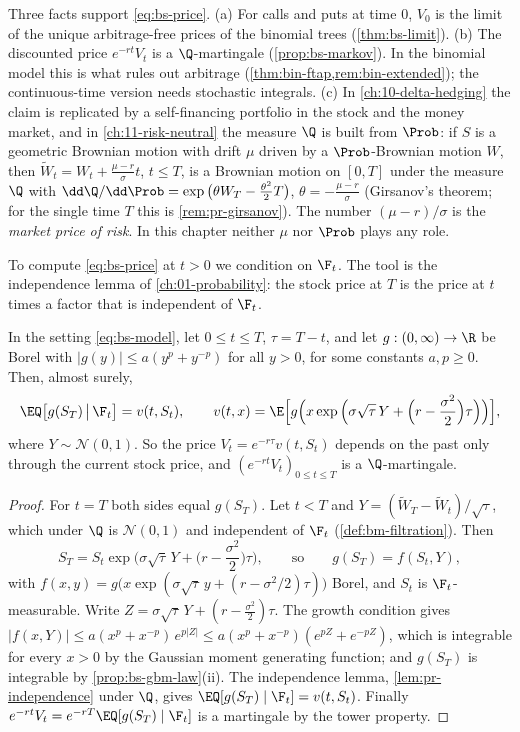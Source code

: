 \begin{remark}\label{rem:bs-justification}
Three facts support \eqref{eq:bs-price}.
(a) For calls and puts at time $0$, $V_0$ is the limit of the unique arbitrage-free prices of
the binomial trees (\cref{thm:bs-limit}). (b) The discounted price $e^{-rt}V_t$ is a
$\Q$-martingale (\cref{prop:bs-markov}). In the binomial model this is what rules out
arbitrage (\cref{thm:bin-ftap,rem:bin-extended}); the continuous-time version needs
stochastic integrals. (c) In \cref{ch:10-delta-hedging} the claim is
replicated by a self-financing portfolio in the stock and the money market, and in
\cref{ch:11-risk-neutral} the measure $\Q$ is built from $\Prob$: if $S$ is a geometric
Brownian motion with drift $\mu$ driven by a $\Prob$-Brownian motion $W$, then
$\widetilde W_t=W_t+\frac{\mu-r}{\sigma}t$, $t\le T$, is a Brownian motion on $[0,T]$ under the measure $\Q$ with
$\dd\Q/\dd\Prob=\exp\big(\theta W_T-\frac{\theta^2}2T\big)$, $\theta=-\frac{\mu-r}{\sigma}$
(Girsanov's theorem; for the single time $T$ this is \cref{rem:pr-girsanov}). The number
$(\mu-r)/\sigma$ is the \emph{market price of risk}. In this chapter neither $\mu$ nor
$\Prob$ plays any role.
\end{remark}

To compute \eqref{eq:bs-price} at $t>0$ we condition on $\F_t$. The tool is the independence
lemma of \cref{ch:01-probability}: the stock price at $T$ is the price at $t$ times a factor
that is independent of $\F_t$.

\begin{proposition}\label{prop:bs-markov}
In the setting \eqref{eq:bs-model}, let $0\le t\le T$, $\tau=T-t$, and let
$g:(0,\infty)\to\R$ be Borel with $|g(y)|\le a(y^p+y^{-p})$ for all $y>0$, for some constants
$a,p\ge0$. Then, almost surely,
\[
  \EQ\big[g(S_T)\,\big|\,\F_t\big]=v(t,S_t),\qquad
  v(t,x)=\E\Big[g\Big(x\exp\Big(\sigma\sqrt\tau\,Y+\Big(r-\frac{\sigma^2}{2}\Big)\tau\Big)\Big)\Big],
\]
where $Y\sim\mathcal N(0,1)$. So the price $V_t=e^{-r\tau}v(t,S_t)$ depends on the past only
through the current stock price, and $(e^{-rt}V_t)_{0\le t\le T}$ is a $\Q$-martingale.
\end{proposition}

\begin{proof}
For $t=T$ both sides equal $g(S_T)$. Let $t<T$ and $Y=(\widetilde W_T-\widetilde W_t)/\sqrt\tau$, which
under $\Q$ is $\mathcal N(0,1)$ and independent of $\F_t$ (\cref{def:bm-filtration}). Then
\[
  S_T=S_t\exp\Big(\sigma\sqrt\tau\,Y+\Big(r-\frac{\sigma^2}2\Big)\tau\Big),\qquad\text{so}\qquad g(S_T)=f(S_t,Y),
\]
with $f(x,y)=g\big(x\exp(\sigma\sqrt\tau\,y+(r-\sigma^2/2)\tau)\big)$ Borel, and $S_t$ is
$\F_t$-measurable. Write $Z=\sigma\sqrt\tau\,Y+(r-\frac{\sigma^2}2)\tau$. The growth condition gives
$|f(x,Y)|\le a(x^p+x^{-p})\,e^{p|Z|}\le a(x^p+x^{-p})(e^{pZ}+e^{-pZ})$, which is integrable for
every $x>0$ by the Gaussian moment generating function; and $g(S_T)$ is integrable by
\cref{prop:bs-gbm-law}(ii). The independence lemma, \cref{lem:pr-independence} under $\Q$,
gives $\EQ[g(S_T)\mid\F_t]=v(t,S_t)$. Finally
$e^{-rt}V_t=e^{-rT}\EQ[g(S_T)\mid\F_t]$ is a martingale by the tower property.
\end{proof}

